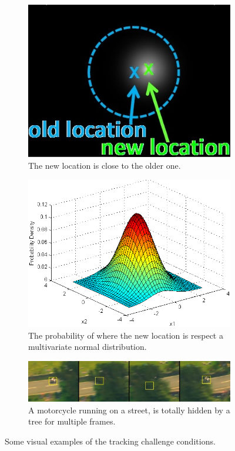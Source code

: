 \begin{figure}[!h]
\begin{subfigure}[!h]{0.49\textwidth}
		\includegraphics[width=\linewidth]{images/tracking/challenge_proximity}
		\caption{The new location is close to the older one.}
		\label{fig:challenge_proximity}
	\end{subfigure}
	\begin{subfigure}[!h]{0.49\textwidth}
		\includegraphics[width=\linewidth]{images/tracking/challenge_multivariate}
		\captionsetup{margin=0.5cm}
		\caption{The probability of where the new location is respect a multivariate normal distribution.}
		\label{fig:challenge_multivariate}
	\end{subfigure}
	\begin{subfigure}[!h]{1\textwidth}
		\includegraphics[width=\linewidth]{images/tracking/challenge_totalOcclusion}
		\caption{A motorcycle running on a street, is totally hidden by a tree for multiple frames.}
		\label{fig:challenge_totalOcclusion}
	\end{subfigure}
	\caption{Some visual examples of the tracking challenge conditions.}
	\label{fig:trackingChallenges}
\end{figure}


